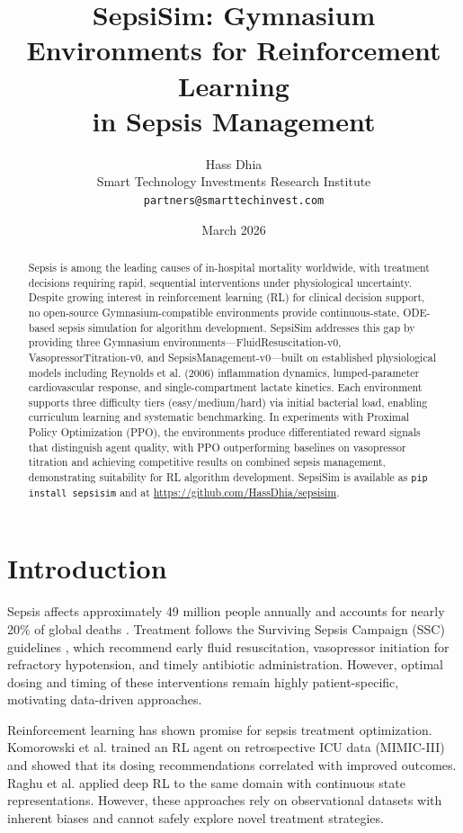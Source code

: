 \documentclass[11pt,a4paper]{article}
\title{SepsiSim: Gymnasium Environments for Reinforcement Learning\\in Sepsis Management}
\author{Hass Dhia\\
Smart Technology Investments Research Institute\\
\texttt{partners@smarttechinvest.com}}
\date{March 2026}
\begin{document}
\maketitle

\begin{abstract}
Sepsis is among the leading causes of in-hospital mortality worldwide, with treatment decisions requiring rapid, sequential interventions under physiological uncertainty. Despite growing interest in reinforcement learning (RL) for clinical decision support, no open-source Gymnasium-compatible environments provide continuous-state, ODE-based sepsis simulation for algorithm development. SepsiSim addresses this gap by providing three Gymnasium environments---FluidResuscitation-v0, VasopressorTitration-v0, and SepsisManagement-v0---built on established physiological models including Reynolds et al. (2006) inflammation dynamics, lumped-parameter cardiovascular response, and single-compartment lactate kinetics. Each environment supports three difficulty tiers (easy/medium/hard) via initial bacterial load, enabling curriculum learning and systematic benchmarking. In experiments with Proximal Policy Optimization (PPO), the environments produce differentiated reward signals that distinguish agent quality, with PPO outperforming baselines on vasopressor titration and achieving competitive results on combined sepsis management, demonstrating suitability for RL algorithm development. SepsiSim is available as \texttt{pip install sepsisim} and at \url{https://github.com/HassDhia/sepsisim}.
\end{abstract}

\section{Introduction}

Sepsis affects approximately 49 million people annually and accounts for nearly 20\% of global deaths \citep{singer2016sepsis3}. Treatment follows the Surviving Sepsis Campaign (SSC) guidelines \citep{rhodes2017surviving, evans2021surviving}, which recommend early fluid resuscitation, vasopressor initiation for refractory hypotension, and timely antibiotic administration. However, optimal dosing and timing of these interventions remain highly patient-specific, motivating data-driven approaches.

Reinforcement learning has shown promise for sepsis treatment optimization. Komorowski et al. \citep{komorowski2018artificial} trained an RL agent on retrospective ICU data (MIMIC-III) and showed that its dosing recommendations correlated with improved outcomes. Raghu et al. \citep{raghu2017deep} applied deep RL to the same domain with continuous state representations. However, these approaches rely on observational datasets with inherent biases and cannot safely explore novel treatment strategies.
\end{document}
